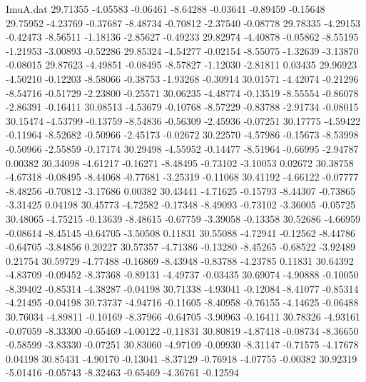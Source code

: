 \begin{filecontents}{ImuA.dat}
  29.71355   -4.05583   -0.06461   -8.64288   -0.03641   -0.89459   -0.15648
  29.75952   -4.23769   -0.37687   -8.48734   -0.70812   -2.37540   -0.08778
  29.78335   -4.29153   -0.42473   -8.56511   -1.18136   -2.85627   -0.49233
  29.82974   -4.40878   -0.05862   -8.55195   -1.21953   -3.00893   -0.52286
  29.85324   -4.54277   -0.02154   -8.55075   -1.32639   -3.13870   -0.08015
  29.87623   -4.49851   -0.08495   -8.57827   -1.12030   -2.81811    0.03435
  29.96923   -4.50210   -0.12203   -8.58066   -0.38753   -1.93268   -0.30914
  30.01571   -4.42074   -0.21296   -8.54716   -0.51729   -2.23800   -0.25571
  30.06235   -4.48774   -0.13519   -8.55554   -0.86078   -2.86391   -0.16411
  30.08513   -4.53679   -0.10768   -8.57229   -0.83788   -2.91734   -0.08015
  30.15474   -4.53799   -0.13759   -8.54836   -0.56309   -2.45936   -0.07251
  30.17775   -4.59422   -0.11964   -8.52682   -0.50966   -2.45173   -0.02672
  30.22570   -4.57986   -0.15673   -8.53998   -0.50966   -2.55859   -0.17174
  30.29498   -4.55952   -0.14477   -8.51964   -0.66995   -2.94787    0.00382
  30.34098   -4.61217   -0.16271   -8.48495   -0.73102   -3.10053    0.02672
  30.38758   -4.67318   -0.08495   -8.44068   -0.77681   -3.25319   -0.11068
  30.41192   -4.66122   -0.07777   -8.48256   -0.70812   -3.17686    0.00382
  30.43441   -4.71625   -0.15793   -8.44307   -0.73865   -3.31425    0.04198
  30.45773   -4.72582   -0.17348   -8.49093   -0.73102   -3.36005   -0.05725
  30.48065   -4.75215   -0.13639   -8.48615   -0.67759   -3.39058   -0.13358
  30.52686   -4.66959   -0.08614   -8.45145   -0.64705   -3.50508    0.11831
  30.55088   -4.72941   -0.12562   -8.44786   -0.64705   -3.84856    0.20227
  30.57357   -4.71386   -0.13280   -8.45265   -0.68522   -3.92489    0.21754
  30.59729   -4.77488   -0.16869   -8.43948   -0.83788   -4.23785    0.11831
  30.64392   -4.83709   -0.09452   -8.37368   -0.89131   -4.49737   -0.03435
  30.69074   -4.90888   -0.10050   -8.39402   -0.85314   -4.38287   -0.04198
  30.71338   -4.93041   -0.12084   -8.41077   -0.85314   -4.21495   -0.04198
  30.73737   -4.94716   -0.11605   -8.40958   -0.76155   -4.14625   -0.06488
  30.76034   -4.89811   -0.10169   -8.37966   -0.64705   -3.90963   -0.16411
  30.78326   -4.93161   -0.07059   -8.33300   -0.65469   -4.00122   -0.11831
  30.80819   -4.87418   -0.08734   -8.36650   -0.58599   -3.83330   -0.07251
  30.83060   -4.97109   -0.09930   -8.31147   -0.71575   -4.17678    0.04198
  30.85431   -4.90170   -0.13041   -8.37129   -0.76918   -4.07755   -0.00382
  30.92319   -5.01416   -0.05743   -8.32463   -0.65469   -4.36761   -0.12594

\end{filecontents}
